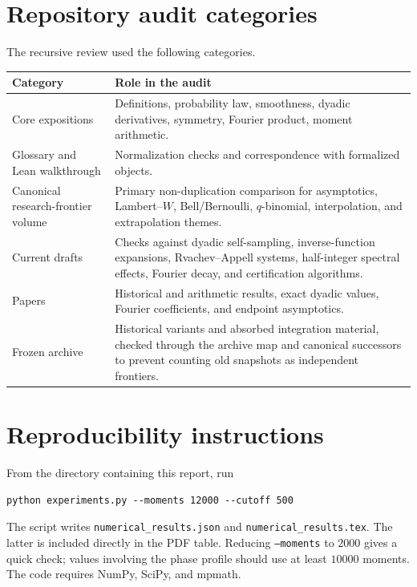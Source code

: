 \documentclass[11pt,oneside]{article}
\theoremstyle{definition}
\theoremstyle{remark}
\newcommand{\1}{\mathbf 1}
\begin{document}
\section{Repository audit categories}

The recursive review used the following categories.
\begin{longtable}{@{}p{}p{}@{}}
\toprule
Category&Role in the audit\\
\midrule
Core expositions&Definitions, probability law, smoothness, dyadic derivatives, symmetry,
Fourier product, moment arithmetic.\\
Glossary and Lean walkthrough&Normalization checks and correspondence with formalized
objects.\\
Canonical research-frontier volume&Primary non-duplication comparison for asymptotics,
Lambert--\(W\), Bell/Bernoulli, \(q\)-binomial, interpolation, and extrapolation themes.\\
Current drafts&Checks against dyadic self-sampling, inverse-function expansions,
Rvachev--Appell systems, half-integer spectral effects, Fourier decay, and certification
algorithms.\\
Papers&Historical and arithmetic results, exact dyadic values, Fourier coefficients, and
endpoint asymptotics.\\
Frozen archive&Historical variants and absorbed integration material, checked through the
archive map and canonical successors to prevent counting old snapshots as independent
frontiers.\\
\bottomrule
\end{longtable}

\section{Reproducibility instructions}

From the directory containing this report, run
\begin{verbatim}
python experiments.py --moments 12000 --cutoff 500
\end{verbatim}
The script writes \texttt{numerical\_results.json} and
\texttt{numerical\_results.tex}.  The latter is included directly in the PDF table.
Reducing \texttt{--moments} to \(2000\) gives a quick check; values involving the
phase profile should use at least \(10000\) moments.  The code requires NumPy, SciPy,
and mpmath.
\end{document}
